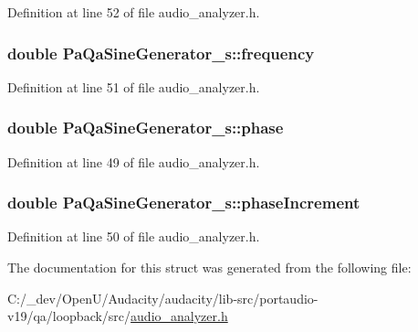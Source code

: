 Definition at line 52 of file audio\+\_\+analyzer.\+h.

\subsubsection[{\texorpdfstring{frequency}{frequency}}]{\setlength{\rightskip}{0pt plus 5cm}double Pa\+Qa\+Sine\+Generator\+\_\+s\+::frequency}\hypertarget{struct_pa_qa_sine_generator__s_ae73569f3aa4212befb0fc87df74d6a7d}{}\label{struct_pa_qa_sine_generator__s_ae73569f3aa4212befb0fc87df74d6a7d}


Definition at line 51 of file audio\+\_\+analyzer.\+h.

\subsubsection[{\texorpdfstring{phase}{phase}}]{\setlength{\rightskip}{0pt plus 5cm}double Pa\+Qa\+Sine\+Generator\+\_\+s\+::phase}\hypertarget{struct_pa_qa_sine_generator__s_a6a53658f28e435c3c7bdd47e36859826}{}\label{struct_pa_qa_sine_generator__s_a6a53658f28e435c3c7bdd47e36859826}


Definition at line 49 of file audio\+\_\+analyzer.\+h.

\subsubsection[{\texorpdfstring{phase\+Increment}{phaseIncrement}}]{\setlength{\rightskip}{0pt plus 5cm}double Pa\+Qa\+Sine\+Generator\+\_\+s\+::phase\+Increment}\hypertarget{struct_pa_qa_sine_generator__s_a7939455f258b2ba52aade79672f3d5ea}{}\label{struct_pa_qa_sine_generator__s_a7939455f258b2ba52aade79672f3d5ea}


Definition at line 50 of file audio\+\_\+analyzer.\+h.



The documentation for this struct was generated from the following file\+:\begin{DoxyCompactItemize}
\item 
C\+:/\+\_\+dev/\+Open\+U/\+Audacity/audacity/lib-\/src/portaudio-\/v19/qa/loopback/src/\hyperlink{audio__analyzer_8h}{audio\+\_\+analyzer.\+h}\end{DoxyCompactItemize}
